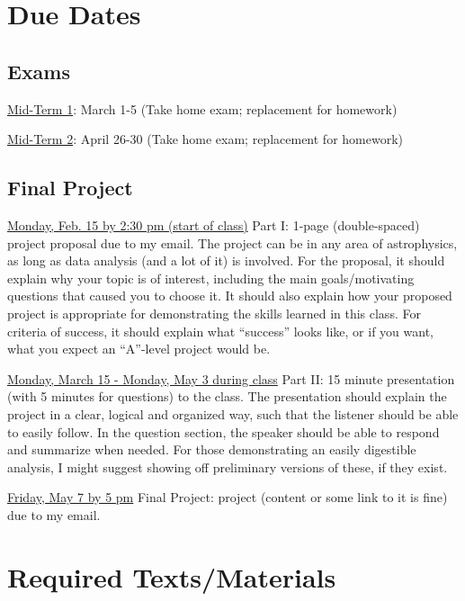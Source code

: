 \documentclass[12pt]{article}
\begin{document}
\section*{\centering Due Dates}
\subsection*{Exams}
\noindent \underline{Mid-Term 1}: March 1-5 (Take home exam; replacement for homework)

\noindent \underline{Mid-Term 2}: April 26-30 (Take home exam; replacement for homework)


\subsection*{Final Project}
\noindent \underline{Monday, Feb. 15 by 2:30 pm (start of class)}
    Part I: 1-page (double-spaced) project proposal due to my email. The project can be in any area of astrophysics, as long as data analysis (and a lot of it) is involved. For the proposal, it should explain why your topic is of interest, including the main goals/motivating questions	 that caused you to choose it. It should also explain how your proposed project is appropriate for demonstrating the skills learned in this class. For criteria of success, it should explain what ``success'' looks like, or if you want, what you expect an ``A''-level project would be.
    
\noindent \underline{Monday, March 15 - Monday, May 3 during class}
    Part II: 15 minute presentation (with 5 minutes for questions) to the class. The presentation should explain the project in a clear, logical and organized way, such that the listener should be able to easily follow. In the question section, the speaker should be able to respond and summarize when needed. For those demonstrating an easily digestible analysis, I might suggest showing off preliminary versions of these, if they exist.

\noindent \underline{Friday, May 7 by 5 pm}
    Final Project: project (content or some link to it is fine) due to my email.

    
\section*{\centering Required Texts/Materials}
\end{document}
